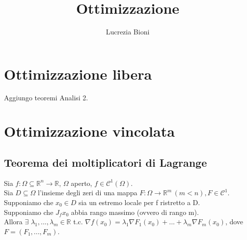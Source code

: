 \documentclass{article} %
\title{Ottimizzazione} %
\author{Lucrezia Bioni} %
\date{} %
\begin{document}
    \maketitle
    \section*{Ottimizzazione libera}
    Aggiungo teoremi Analisi 2.

    \section*{Ottimizzazione vincolata}
    \subsection*{Teorema dei moltiplicatori di Lagrange}
    Sia $f:\Omega \subseteq \mathbb{R} ^n \to \mathbb{R}$, $\Omega$ aperto, $f \in \mathcal{C} ^1 (\Omega)$. \\ Sia $D \subseteq \Omega$ l'insieme degli zeri di una mappa $F: \Omega \to \mathbb{R} ^m \, (m<n), F \in \mathcal{C} ^1$. \\ Supponiamo che $x_0 \in D$ sia un estremo locale per f ristretto a D. \\ Supponiamo che $J_f{x_0}$ abbia rango massimo (ovvero di rango m). \\
    Allora $\exists$ $\lambda_1,...,\lambda_m \in \mathbb{R}$ t.c. $\nabla f(x_0) = \lambda_1 \nabla F_1(x_0) + ... + \lambda_m \nabla F_m(x_0)$, dove $F=(F_1, ... , F_m)$.
    
    
\end{document}
